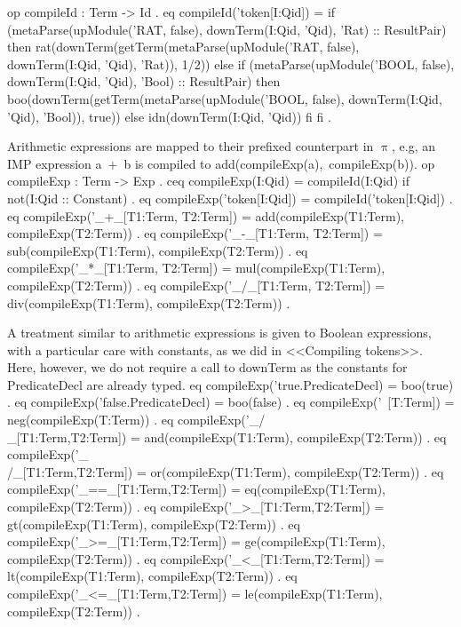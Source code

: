 \documentclass[a4paper,openany]{book}
\begin{document}
 op compileId : Term -> Id .
 eq compileId('token[I:Qid]) =
    if (metaParse(upModule('RAT, false), 
         downTerm(I:Qid, 'Qid), 'Rat)  :: ResultPair)
        then rat(downTerm(getTerm(metaParse(upModule('RAT, false),
              downTerm(I:Qid, 'Qid), 'Rat)), 1/2))
    else
     if (metaParse(upModule('BOOL, false), 
          downTerm(I:Qid, 'Qid), 'Bool) :: ResultPair)
     then boo(downTerm(getTerm(metaParse(upModule('BOOL, false),
                   downTerm(I:Qid, 'Qid), 'Bool)), true))
     else idn(downTerm(I:Qid, 'Qid))
     fi
    fi .
\nwendcode{}\nwdocspar

Arithmetic expressions are mapped to their prefixed counterpart in $\uppi$, e.g, an IMP expression {\Tt{}a\ +\ b\nwendquote} is compiled to {\Tt{}add(compileExp(a),\ compileExp(b))\nwendquote}.
\nwenddocs{}\endmoddef\nwstartdeflinemarkup\nwenddeflinemarkup
 op compileExp : Term -> Exp .
 ceq compileExp(I:Qid) = compileId(I:Qid) 
  if not(I:Qid :: Constant) .
 eq compileExp('token[I:Qid]) = compileId('token[I:Qid]) .
 eq compileExp('_+_[T1:Term, T2:Term]) =
     add(compileExp(T1:Term), compileExp(T2:Term)) .
 eq compileExp('_-_[T1:Term, T2:Term]) =
     sub(compileExp(T1:Term), compileExp(T2:Term)) .
 eq compileExp('_*_[T1:Term, T2:Term]) =
     mul(compileExp(T1:Term), compileExp(T2:Term)) .
 eq compileExp('_/_[T1:Term, T2:Term]) =
     div(compileExp(T1:Term), compileExp(T2:Term)) .
\nwendcode{}\nwdocspar

A treatment similar to arithmetic expressions is given to Boolean expressions, with a particular care with constants, as we did in  <<Compiling tokens>>. Here, however, we do not require a call to {\Tt{}downTerm\nwendquote} as the constants for {\Tt{}PredicateDecl\nwendquote} are already typed.
\nwenddocs{}\endmoddef\nwstartdeflinemarkup\nwenddeflinemarkup
 eq compileExp('true.PredicateDecl) = boo(true) .
 eq compileExp('false.PredicateDecl) = boo(false) .
 eq compileExp('~[T:Term]) = neg(compileExp(T:Term)) .
 eq compileExp('_/\\_[T1:Term,T2:Term]) = 
    and(compileExp(T1:Term), compileExp(T2:Term)) .
 eq compileExp('_\\/_[T1:Term,T2:Term]) = 
    or(compileExp(T1:Term), compileExp(T2:Term)) .
 eq compileExp('_==_[T1:Term,T2:Term]) = 
    eq(compileExp(T1:Term), compileExp(T2:Term)) .
 eq compileExp('_>_[T1:Term,T2:Term]) = 
    gt(compileExp(T1:Term), compileExp(T2:Term)) .
 eq compileExp('_>=_[T1:Term,T2:Term]) = 
    ge(compileExp(T1:Term), compileExp(T2:Term)) .
 eq compileExp('_<_[T1:Term,T2:Term]) =  
    lt(compileExp(T1:Term), compileExp(T2:Term)) .
 eq compileExp('_<=_[T1:Term,T2:Term]) = 
    le(compileExp(T1:Term), compileExp(T2:Term)) .
\nwendcode{}\nwdocspar
\end{document}
